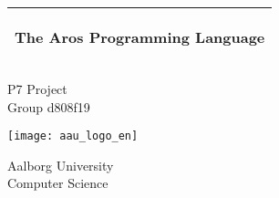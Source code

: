 \begin{titlepage}
  \noindent%
  \begin{tabular}{@{}p{\textwidth}@{}}
    \toprule[2pt]
    \midrule
    \vspace{0.2cm}
    \begin{center}
    \LARGE{\textbf{
      The Aros Programming Language%
    }}
    \end{center}
    \vspace{0.2cm}\\
    \midrule
    \toprule[2pt]
  \end{tabular}
  \vspace{4 cm}
  \begin{center}
    \vspace{0.2cm}
    {\Large
     P7 Project\\Group d808f19 %
      \break
      
      \texttt{[image: aau\_logo\_en]}
    }
  \end{center}
  \vfill
  \begin{center}
  Aalborg University\\
  Computer Science
  \end{center}
\end{titlepage}
\cleardoublepage
